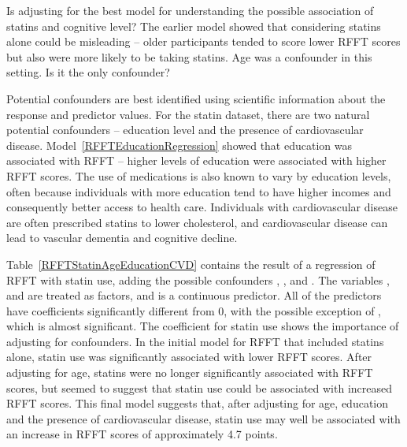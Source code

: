 Is adjusting for  the best model for understanding the possible association of statins and cognitive level?  The earlier model showed that considering statins alone could be misleading -- older participants tended to score lower RFFT scores but also were more likely to be taking statins.  Age was a confounder in this setting.  Is it the only confounder?

Potential confounders are best identified using scientific information about the response and predictor values.  For the statin dataset, there are two natural potential confounders -- education level and the presence of cardiovascular disease. Model~\ref{RFFTEducationRegression} showed that education was associated with RFFT -- higher levels of education were associated with higher RFFT scores.  The use of medications is also known to vary by education levels, often because individuals with more education tend to have higher incomes and consequently better access to health care.  Individuals with cardiovascular disease are often prescribed statins to lower cholesterol, and cardiovascular disease can lead to vascular dementia and cognitive decline.  

Table~\ref{RFFTStatinAgeEducationCVD} contains the result of a regression of RFFT with statin use, adding the possible confounders , , and . The variables ,  and  are treated as factors, and  is a continuous predictor.  All of the predictors have coefficients significantly different from 0, with the possible exception of , which is almost significant.  The coefficient for statin use shows the importance of adjusting for confounders.  In the initial model for RFFT that included statins alone, statin use was significantly associated with lower RFFT scores.  After adjusting for age, statins were no longer significantly associated with RFFT scores, but seemed to suggest that statin use could be associated with increased RFFT scores.  This final model suggests that, after adjusting for age, education and the presence of cardiovascular disease, statin use may well be associated with an increase in RFFT scores of approximately 4.7 points.


